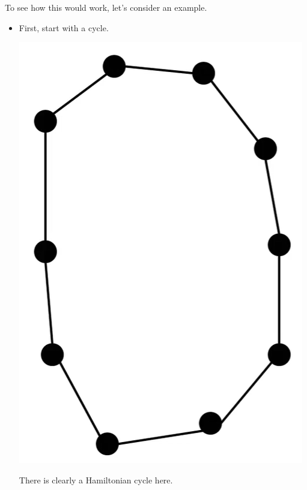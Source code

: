 \documentclass[letterpaper]{article}
\begin{document}
To see how this would work, let's consider an example. 
\begin{itemize}
    \item First, start with a cycle. 
    \begin{center}
        \includegraphics[scale=0.35]{../assets/zoe_ham_1.png}
    \end{center}
    There is clearly a Hamiltonian cycle here.


\end{itemize}
\end{document}
